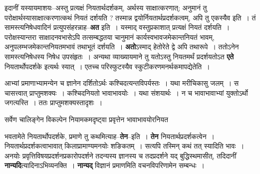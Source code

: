 \documentclass[article,12pt,a4paper]{memoir}
\begin{document}
	  \pstart इदानीं यस्यायमाशयः--अस्तु प्रत्यक्षं नियतार्थदर्शकम्, अर्थस्य साक्षात्करणात्; अनुमानं तु परोक्षार्थस्यासाक्षात्करणात्कथं नियतं दर्शयति ? तस्मान्न द्वयोर्नियतार्थप्रदर्शकत्वम्, अपि तु एकस्यैव इति । तं सामस्त्यनिषेधवादिनं प्रत्युपसंहरन्नाह--\textbf{अत} इति । यस्माद् वस्तुप्रकाशात् प्रत्यक्षं नियतं दर्शयति । परोक्षस्यान्तरा साक्षादनवभासेऽपि तत्सम्बद्धतया चानुमानं कार्यस्वभावजमेकान्तनियतं भावम्, अनुपलम्भजमेकान्तनियतमभावं तथाभूतं दर्शयति । \textbf{अतो}ऽस्माद् हेतोरेते द्वे अपि तथारूपे । ततोऽनेन सामस्त्यनिषेधस्य निषेध उपसंहृतः । अन्यथा व्याख्यायमाने तु यतोऽस्तु नियतमर्थं प्रदर्शयतोऽत \textbf{एते} नियतार्थोपदर्शके इत्यर्थः स्यात् । एतच्च परिस्फुटस्यैव स्कुटीकरणमनर्थकमापद्येतेति ।
	\pend
	  \bigskip
	  \begingroup
	

	  \pstart आभ्यां प्रमाणाभ्यामन्येन च ज्ञानेन दर्शितोऽर्थः कश्चिदत्यन्तविपर्यस्तः । यथा मरीचिकासु जलम् । स चासत्त्वात् प्राप्तुमशक्यः । कश्चिदनियतो भावाभावयोः । यथा संशयार्थः । न च भावाभावाभ्यां युक्तोऽर्थो जगत्यस्ति । ततः प्राप्तुमशक्यस्तादृशः ।
	\pend
        

	  \pstart सर्वेण चालिङ्गेन विकल्पेन नियामकमदृष्ट्वा प्रवृत्तेन भावाभावयोरनियत
	\pend
      
	  \endgroup
	

	  \pstart भवतामेते नियतार्थोपदर्शके, प्रमाणे तु कथमित्याह--\textbf{तेन}--इति । \textbf{तेन} नियतार्थप्रदर्शकत्वेन । नियतार्थप्रदर्शकत्वाभावात् किलाप्रामाण्यमनयोः शङिकतम् । सत्यपि तस्मिन् कथं तत् स्यादिति भावः । अनयोः प्रवृत्तिविषयप्रदर्शनप्रकारोपदर्शने तदन्यस्य ज्ञानस्य च तदप्रदर्शने यद् बुद्धिस्थमासीत्, तदिदानीं \textbf{नान्यदि}त्यादिनाऽभिव्यनक्ति । \textbf{नान्यद्} विज्ञानं प्रमाणमिति वचनविपरिणामेन सम्बन्धः ।
	\pend
      
\end{document}

